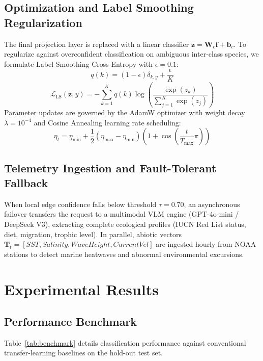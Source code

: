 \documentclass[conference]{IEEEtran}
\begin{document}
\subsection{Optimization and Label Smoothing Regularization}
The final projection layer is replaced with a linear classifier $\mathbf{z} = \mathbf{W}_c \mathbf{f} + \mathbf{b}_c$. To regularize against overconfident classification on ambiguous inter-class species, we formulate Label Smoothing Cross-Entropy with $\epsilon = 0.1$:
\begin{equation}
q(k) = (1 - \epsilon)\delta_{k, y} + \frac{\epsilon}{K}
\end{equation}
\begin{equation}
\mathcal{L}_{\text{LS}}(\mathbf{z}, y) = - \sum_{k=1}^K q(k) \log \left( \frac{\exp(z_k)}{\sum_{j=1}^K \exp(z_j)} \right)
\end{equation}
Parameter updates are governed by the AdamW optimizer \cite{loshchilov2019} with weight decay $\lambda = 10^{-4}$ and Cosine Annealing learning rate scheduling:
\begin{equation}
\eta_t = \eta_{\min} + \frac{1}{2}(\eta_{\max} - \eta_{\min})\left(1 + \cos\left(\frac{t}{T_{\max}}\pi\right)\right)
\end{equation}

\subsection{Telemetry Ingestion and Fault-Tolerant Fallback}
When local edge confidence falls below threshold $\tau = 0.70$, an asynchronous failover transfers the request to a multimodal VLM engine (GPT-4o-mini / DeepSeek V3), extracting complete ecological profiles (IUCN Red List status, diet, migration, trophic level). In parallel, abiotic vectors $\mathbf{T}_t = [SST, Salinity, WaveHeight, CurrentVel]$ are ingested hourly from NOAA stations to detect marine heatwaves and abnormal environmental excursions.

\section{Experimental Results}
\subsection{Performance Benchmark}
Table~\ref{tab:benchmark} details classification performance against conventional transfer-learning baselines on the hold-out test set.
\end{document}
